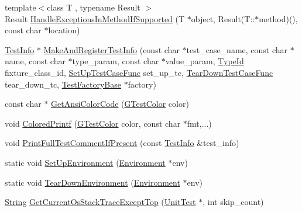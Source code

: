 \begin{DoxyCompactItemize}
{\footnotesize template$<$class T , typename Result $>$ }\\\-Result \hyperlink{namespacetesting_1_1internal_a0034a1799f52bef77bb3b810af8b8969}{\-Handle\-Exceptions\-In\-Method\-If\-Supported} (\-T $\ast$object, \-Result(\-T\-::$\ast$method)(), const char $\ast$location)
\item 
\hyperlink{classtesting_1_1TestInfo}{\-Test\-Info} $\ast$ \hyperlink{namespacetesting_1_1internal_a8f58f081cff056a35d18746667a16c4f}{\-Make\-And\-Register\-Test\-Info} (const char $\ast$test\-\_\-case\-\_\-name, const char $\ast$name, const char $\ast$type\-\_\-param, const char $\ast$value\-\_\-param, \hyperlink{namespacetesting_1_1internal_ac8e91f0c6a06c0361dc3152ddfeb2342}{\-Type\-Id} fixture\-\_\-class\-\_\-id, \hyperlink{namespacetesting_1_1internal_abdd2548fdbf05907e439e416dab030ec}{\-Set\-Up\-Test\-Case\-Func} set\-\_\-up\-\_\-tc, \hyperlink{namespacetesting_1_1internal_a0d7d11b7ce3a8f9d969e0dfb543dde3d}{\-Tear\-Down\-Test\-Case\-Func} tear\-\_\-down\-\_\-tc, \hyperlink{classtesting_1_1internal_1_1TestFactoryBase}{\-Test\-Factory\-Base} $\ast$factory)
\item 
const char $\ast$ \hyperlink{namespacetesting_1_1internal_a381864cc8cad6df85e53dcee3b0cea92}{\-Get\-Ansi\-Color\-Code} (\hyperlink{namespacetesting_1_1internal_ae78c352c52b710a680c35b87b1c5d965}{\-G\-Test\-Color} color)
\item 
void \hyperlink{namespacetesting_1_1internal_a50a94fd99435d0a4dc57b7ca17860d92}{\-Colored\-Printf} (\hyperlink{namespacetesting_1_1internal_ae78c352c52b710a680c35b87b1c5d965}{\-G\-Test\-Color} color, const char $\ast$fmt,...)
\item 
void \hyperlink{namespacetesting_1_1internal_a75563c3d082e5343e8da2bad4e813b4d}{\-Print\-Full\-Test\-Comment\-If\-Present} (const \hyperlink{classtesting_1_1TestInfo}{\-Test\-Info} \&test\-\_\-info)
\item 
static void \hyperlink{namespacetesting_1_1internal_a70bc8320887c024883c4350b40891a1f}{\-Set\-Up\-Environment} (\hyperlink{classtesting_1_1Environment}{\-Environment} $\ast$env)
\item 
static void \hyperlink{namespacetesting_1_1internal_ad03ec49f30777e3940aac9bd7ee087fd}{\-Tear\-Down\-Environment} (\hyperlink{classtesting_1_1Environment}{\-Environment} $\ast$env)
\item 
\hyperlink{classtesting_1_1internal_1_1String}{\-String} \hyperlink{namespacetesting_1_1internal_aa233c580f5aa0ac5abf54608bc3366bc}{\-Get\-Current\-Os\-Stack\-Trace\-Except\-Top} (\hyperlink{classtesting_1_1UnitTest}{\-Unit\-Test} $\ast$, int skip\-\_\-count)

\end{DoxyCompactItemize}
